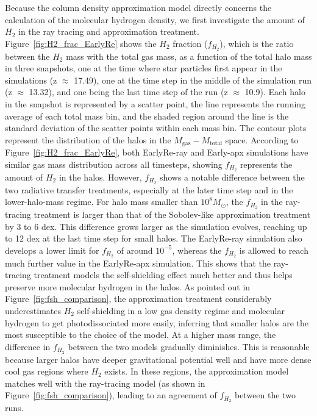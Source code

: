 \documentclass[linenumbers, twocolumn]{aastex631}
\begin{document}
Because the column density approximation model directly concerns the calculation of the molecular hydrogen density, we first investigate the amount of $H_{2}$ in the ray tracing and approximation treatment. Figure~\ref{fig:H2_frac_EarlyRe} shows the $H_{2}$ fraction ($f_{H_{2}}$), which is the ratio between the $H_{2}$ mass with the total gas mass, as a function of the total halo mass in three snapshots, one at the time where star particles first appear in the simulations (z $\approx$ 17.49), one at the time step in the middle of the simulation run (z $\approx$ 13.32), and one being the last time step of the run (z $\approx$ 10.9). Each halo in the snapshot is represented by a scatter point, the line represents the running average of each total mass bin, and the shaded region around the line is the standard deviation of the scatter points within each mass bin. The contour plots represent the distribution of the halos in the $M_{\text{gas}} - M_{\text{total}}$ space. According to Figure~\ref{fig:H2_frac_EarlyRe}, both EarlyRe-ray and Early-apx simulations have similar gas mass distribution across all timesteps, showing $f_{H_{2}}$ represents the amount of $H_{2}$ in the halos. However, $f_{H_{2}}$ shows a notable difference between the two radiative transfer treatments, especially at the later time step and in the lower-halo-mass regime. For halo mass smaller than $10^{8} M_\odot$, the $f_{H_{2}}$ in the ray-tracing treatment is larger than that of the Sobolev-like approximation treatment by 3 to 6 dex. This difference grows larger as the simulation evolves, reaching up to 12 dex at the last time step for small halos. The EarlyRe-ray simulation also develops a lower limit for $f_{H_{2}}$ of around $10^{-5}$, whereas the $f_{H_{2}}$ is allowed to reach much further value in the EarlyRe-apx simulation. This shows that the ray-tracing treatment models the self-shielding effect much better and thus helps preserve more molecular hydrogen in the halos. As pointed out in Figure~\ref{fig:fsh_comparison}, the approximation treatment considerably underestimates $H_{2}$ self-shielding in a low gas density regime and molecular hydrogen to get photodissociated more easily, inferring that smaller halos are the most susceptible to the choice of the model. At a higher mass range, the difference in $f_{H_{2}}$ between the two models gradually diminishes. This is reasonable because larger halos have deeper gravitational potential well and have more dense cool gas regions where $H_{2}$ exists. In these regions, the approximation model matches well with the ray-tracing model (as shown in Figure~\ref{fig:fsh_comparison}), leading to an agreement of $f_{H_{2}}$ between the two runs. 
\end{document}
